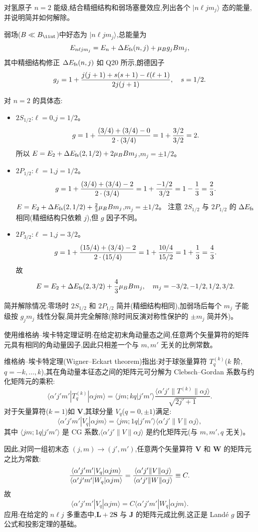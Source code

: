\begin{question}
对氢原子 $n=2$ 能级,结合精细结构和弱场塞曼效应,列出各个 $|n\ell jm_j\rangle$ 态的能量,并说明简并如何解除。
\end{question}
\begin{solution}
弱场($B\ll B_{\rm \ii nt}$)中好态为 $|n\ell j m_j\rangle$,总能量为
\[
E_{n\ell j m_j}=E_n+\Delta E_{\rm fs}(n,j)+\mu_B g_j B m_j,
\]
其中精细结构修正 $\Delta E_{\rm fs}(n,j)$ 如 Q20 所示,朗德因子
\[
g_j=1+{j(j+1)+s(s+1)-\ell(\ell+1)\over2j(j+1)},\quad s=1/2.
\]

对 $n=2$ 的具体态:
\begin{itemize}
\item $2S_{1/2}$:$\ell=0$,$j=1/2$。
  \[
  g=1+{(3/4)+(3/4)-0\over2\cdot(3/4)}=1+{3/2\over3/2}=2.
  \]
  所以 $E=E_2+\Delta E_{\rm fs}(2,1/2)+2\mu_B B m_j$,$m_j=\pm1/2$。
\item $2P_{1/2}$:$\ell=1$,$j=1/2$。
  \[
  g=1+{(3/4)+(3/4)-2\over2\cdot(3/4)}=1+{-1/2\over3/2}=1-{1\over3}={2\over3}.
  \]
  $E=E_2+\Delta E_{\rm fs}(2,1/2)+{2\over3}\mu_B B m_j$,$m_j=\pm1/2$。
  注意 $2S_{1/2}$ 与 $2P_{1/2}$ 的 $\Delta E_{\rm fs}$ 相同(精细结构只依赖 $j$),但 $g$ 因子不同。
\item $2P_{3/2}$:$\ell=1$,$j=3/2$。
  \[
  g=1+{(15/4)+(3/4)-2\over2\cdot(15/4)}=1+{10/4\over15/2}=1+{1\over3}={4\over3}.
  \]
  故
  \[
  E=E_2+\Delta E_{\rm fs}(2,3/2)+{4\over3}\mu_B B m_j,\quad m_j=-3/2,-1/2,1/2,3/2.
  \]
\end{itemize}
简并解除情况:零场时 $2S_{1/2}$ 和 $2P_{1/2}$ 简并(精细结构相同),加弱场后每个 $m_j$ 子能级按 $g_j m_j$ 线性分裂,简并完全解除(除时间反演对称性保护的 $\pm m_j$ 简并外)。
\end{solution}

\begin{question}
使用维格纳--埃卡特定理证明:在给定初末角动量态之间,任意两个矢量算符的矩阵元具有相同的角动量因子,因此只相差一个与 $m,m'$ 无关的比例常数。
\end{question}
\begin{solution}
维格纳--埃卡特定理(Wigner--Eckart theorem)指出:对于球张量算符 $T_q^{(k)}$($k$ 阶,$q=-k,\dots,k$),其在角动量本征态之间的矩阵元可分解为 Clebsch--Gordan 系数与约化矩阵元的乘积:
\[
\langle \alpha'j'm'|T_q^{(k)}|\alpha jm\rangle
=\langle jm;kq|j'm'\rangle
\frac{\langle \alpha'j'\|T^{(k)}\|\alpha j\rangle}{\sqrt{2j'+1}}.
\]
对于矢量算符($k=1$)如 $\mathbf V$,其球分量 $V_q$($q=0,\pm1$)满足:
\[
\langle \alpha'j'm'|V_q|\alpha jm\rangle
=\langle jm;1q|j'm'\rangle
\langle \alpha'j'\|V\|\alpha j\rangle,
\]
其中 $\langle jm;1q|j'm'\rangle$ 是 CG 系数,$\langle \alpha'j'\|V\|\alpha j\rangle$ 是约化矩阵元(与 $m,m',q$ 无关)。

因此,对同一组初末态 $(j,m)\to(j',m')$,任意两个矢量算符 $\mathbf V$ 和 $\mathbf W$ 的矩阵元之比为常数:
\[
{\langle \alpha'j'm'|V_q|\alpha jm\rangle\over
\langle \alpha'j'm'|W_q|\alpha jm\rangle}
={\langle \alpha'j'\|V\|\alpha j\rangle\over
\langle \alpha'j'\|W\|\alpha j\rangle}
\equiv C.
\]
故
\[
\boxed{\langle \alpha'j'm'|V_q|\alpha jm\rangle
=C\langle \alpha'j'm'|W_q|\alpha jm\rangle.}
\]
应用:在给定的 $n\ell j$ 多重态中,$\mathbf L+2\mathbf S$ 与 $\mathbf J$ 的矩阵元成比例,这正是 Land\'e $g$ 因子公式和投影定理的基础。
\end{solution}

